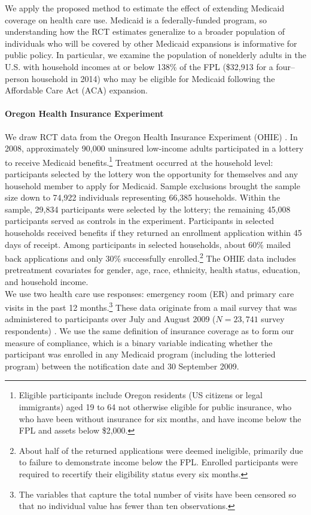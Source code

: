 \documentclass[12pt]{article}
\begin{document}
We apply the proposed method to estimate the effect of extending Medicaid coverage on health care use.  Medicaid is a federally-funded program, so understanding how the RCT estimates generalize to a broader population of individuals who will be covered by other Medicaid expansions is informative for public policy. In particular, we examine the population of nonelderly adults in the U.S. with household incomes at or below 138\% of the FPL (\$32,913 for a four--person household in 2014) who may be eligible for Medicaid following the Affordable Care Act (ACA) expansion.

\paragraph{Oregon Health Insurance Experiment}

We draw RCT data from the Oregon Health Insurance Experiment (OHIE) \citep{finkelstein2012,baicker2013,baicker2014,Taubman}.  In 2008, approximately 90,000 uninsured low-income adults participated in a lottery to receive Medicaid benefits.\footnote{Eligible participants include Oregon residents (US citizens or legal immigrants) aged 19 to 64 not otherwise eligible for public insurance, who who have been without insurance for six months, and have income below the FPL and assets below \$2,000.} Treatment occurred at the household level: participants selected by the lottery won the opportunity for themselves and any household member to apply for Medicaid. Sample exclusions brought the sample size down to 74,922 individuals representing 66,385 households.  Within the sample, 29,834 participants were selected by the lottery; the remaining 45,008 participants served as controls in the experiment.  Participants in selected households received benefits if they returned an enrollment application within 45 days of receipt. Among participants in selected households, about 60\% mailed back applications and only 30\% successfully enrolled.\footnote{About half of the returned applications were deemed ineligible, primarily due to failure to demonstrate income below the FPL. Enrolled participants were required to recertify their eligibility status every six months.} The OHIE data includes pretreatment covariates for gender, age, race, ethnicity, health status, education, and household income. \\

We use two health care use responses: emergency room (ER) and primary care visits in the past 12 months.\footnote{The variables that capture the total number of visits have been censored so that no individual value has fewer than ten observations.} These data originate from a mail survey that was administered to participants over July and August 2009 ($N = 23,741$ survey respondents) \cite{finkelstein2012}. We use the same definition of insurance coverage as \citet{finkelstein2012} to form our measure of compliance, which is a binary variable indicating whether the participant was enrolled in any Medicaid program (including the lotteried program) between the notification date and 30 September 2009. 
\end{document}
